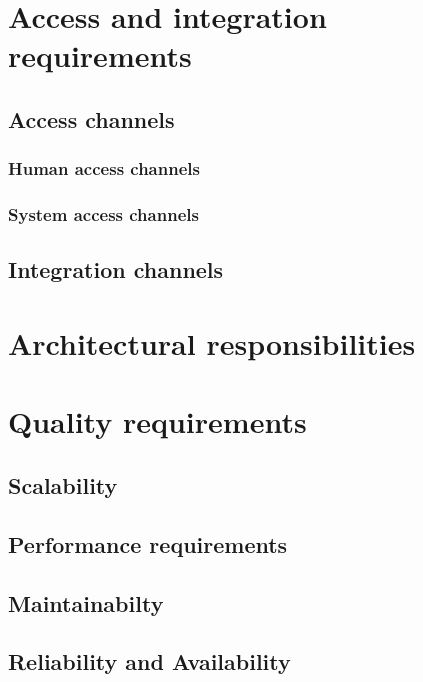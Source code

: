 \documentclass[a4paper,11pt]{article}
\begin{document}
\newpage
\setlength{\voffset}{-3cm}

\section{Access and integration requirements}
\subsection{Access channels}
\subsubsection{Human access channels} %
\subsubsection{System access channels}%


\subsection{Integration channels}

\section{Architectural responsibilities}

\section{Quality requirements}
\subsection{Scalability}
\subsection{Performance requirements}
\subsection{Maintainabilty}
\subsection{Reliability and Availability}
\end{document}

